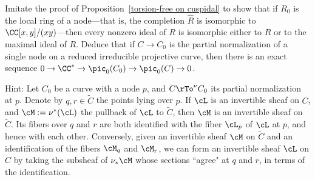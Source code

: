 \begin{exercise}\label{linear series on a nodal curve}
Imitate the proof of Proposition~\ref{torsion-free on cuspidal} to show that if $R_{0}$ is the local ring of a node---that is, the completion $\widehat R$ is isomorphic to $\CC[x,y]/(xy)$---then every nonzero ideal of $R$ is isomorphic
either to $R$ or to the maximal ideal of $R$. Deduce that if $C\to C_{0}$ is the
partial normalization of a single node on a reduced irreducible projective curve, then there is an exact sequence
$0\to \CC^{*} \to \pic_{0}(C_{0}) \to \pic_{0}(C) \to 0$.

Hint:
Let $C_{0}$ be a curve with a node $p$, and $C \rTo^\nu C_{0}$ its partial normalization at $p$. Denote by $q,r \in \widetilde C$ the points lying over $p$. If $\cL$ is an invertible sheaf on $C$, and $\cM := \nu^*(\cL)$ the pullback of $\cL$ to $\widetilde C$, then $\cM$ is an invertible sheaf on $\widetilde C$. Its fibers over $q$ and $r$ are both identified with the fiber $\cL_p$ of $\cL$ at $p$, and hence with each other. Conversely, given an invertible sheaf $\cM$ on $\widetilde C$ and an identification of the fibers $\cM_q$ and $\cM_r$, we can form an invertible sheaf $\cL$ on $C$ by taking the subsheaf of $\nu_*\cM$ whose sections ``agree" at $q$ and $r$, in terms of the identification. 
\end{exercise}
 

